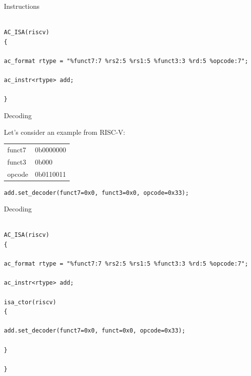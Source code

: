 \begin{frame}[fragile]{Instructions}

\begin{lstlisting}

AC_ISA(riscv)
{

ac_format rtype = "%funct7:7 %rs2:5 %rs1:5 %funct3:3 %rd:5 %opcode:7";

ac_instr<rtype> add;

}

\end{lstlisting}
\end{frame}

\begin{frame}[fragile]{Decoding}

Let's consider an example from RISC-V:

\pause


\bigskip
\pause


\pause
\bigskip

\ttfamily\scriptsize{
\begin{tabular}{l l}
funct7 & 0b0000000 \\
funct3 & 0b000 \\
opcode & 0b0110011 \\
\end{tabular}
}

\pause

\begin{lstlisting}
add.set_decoder(funct7=0x0, funct3=0x0, opcode=0x33);
\end{lstlisting}

\end{frame}

\begin{frame}[fragile]{Decoding}

\begin{lstlisting}

AC_ISA(riscv)
{

ac_format rtype = "%funct7:7 %rs2:5 %rs1:5 %funct3:3 %rd:5 %opcode:7";

ac_instr<rtype> add;

isa_ctor(riscv)
{

add.set_decoder(funct7=0x0, funct=0x0, opcode=0x33);

}

}

\end{lstlisting}
\end{frame}


